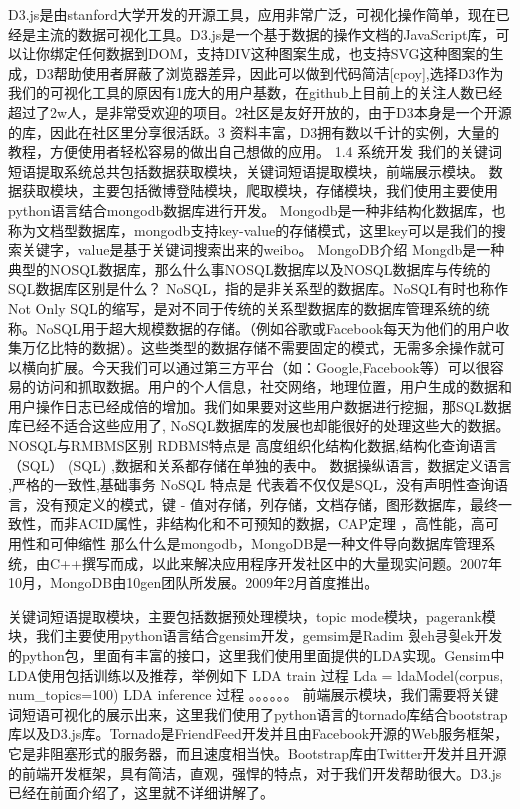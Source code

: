 \documentclass[master]{njuthesis}
\begin{document}
D3.js是由stanford大学开发的开源工具，应用非常广泛，可视化操作简单，现在已经是主流的数据可视化工具。D3.js是一个基于数据的操作文档的JavaScript库，可以让你绑定任何数据到DOM，支持DIV这种图案生成，也支持SVG这种图案的生成，D3帮助使用者屏蔽了浏览器差异，因此可以做到代码简洁[cpoy],选择D3作为我们的可视化工具的原因有1庞大的用户基数，在github上目前上的关注人数已经超过了2w人，是非常受欢迎的项目。2社区是友好开放的，由于D3本身是一个开源的库，因此在社区里分享很活跃。3 资料丰富，D3拥有数以千计的实例，大量的教程，方便使用者轻松容易的做出自己想做的应用。
1.4 系统开发
我们的关键词短语提取系统总共包括数据获取模块，关键词短语提取模块，前端展示模块。
数据获取模块，主要包括微博登陆模块，爬取模块，存储模块，我们使用主要使用python语言结合mongodb数据库进行开发。
Mongodb是一种非结构化数据库，也称为文档型数据库，mongodb支持key-value的存储模式，这里key可以是我们的搜索关键字，value是基于关键词搜索出来的weibo。
MongoDB介绍
Mongdb是一种典型的NOSQL数据库，那么什么事NOSQL数据库以及NOSQL数据库与传统的SQL数据库区别是什么？
NoSQL，指的是非关系型的数据库。NoSQL有时也称作Not Only SQL的缩写，是对不同于传统的关系型数据库的数据库管理系统的统称。NoSQL用于超大规模数据的存储。（例如谷歌或Facebook每天为他们的用户收集万亿比特的数据）。这些类型的数据存储不需要固定的模式，无需多余操作就可以横向扩展。今天我们可以通过第三方平台（如：Google,Facebook等）可以很容易的访问和抓取数据。用户的个人信息，社交网络，地理位置，用户生成的数据和用户操作日志已经成倍的增加。我们如果要对这些用户数据进行挖掘，那SQL数据库已经不适合这些应用了, NoSQL数据库的发展也却能很好的处理这些大的数据。
NOSQL与RMBMS区别
RDBMS特点是 高度组织化结构化数据,结构化查询语言（SQL） (SQL) ,数据和关系都存储在单独的表中。 数据操纵语言，数据定义语言 ,严格的一致性,基础事务
NoSQL 特点是 代表着不仅仅是SQL，没有声明性查询语言，没有预定义的模式，键 - 值对存储，列存储，文档存储，图形数据库，最终一致性，而非ACID属性，非结构化和不可预知的数据，CAP定理 ，高性能，高可用性和可伸缩性
那么什么是mongodb，MongoDB是一种文件导向数据库管理系统，由C++撰写而成，以此来解决应用程序开发社区中的大量现实问题。2007年10月，MongoDB由10gen团队所发展。2009年2月首度推出。

关键词短语提取模块，主要包括数据预处理模块，topic mode模块，pagerank模块，我们主要使用python语言结合gensim开发，gemsim是Radim 힀eh킁힂ek开发的python包，里面有丰富的接口，这里我们使用里面提供的LDA实现。Gensim中LDA使用包括训练以及推荐，举例如下
LDA train 过程
Lda = ldaModel(corpus, num\_topics=100)
LDA inference 过程
。。。。。。
前端展示模块，我们需要将关键词短语可视化的展示出来，这里我们使用了python语言的tornado库结合bootstrap库以及D3.js库。Tornado是FriendFeed开发并且由Facebook开源的Web服务框架，它是非阻塞形式的服务器，而且速度相当快。Bootstrap库由Twitter开发并且开源的前端开发框架，具有简洁，直观，强悍的特点，对于我们开发帮助很大。D3.js已经在前面介绍了，这里就不详细讲解了。
\end{document}

